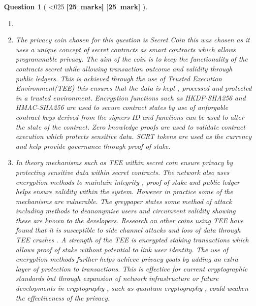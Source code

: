 \documentclass[a4paper]{article}
\theoremstyle{que}
\newtheorem{question}{Question}
\newcommand\points[1]{%
\ifnum1<0#1\relax%
    {\bf \small [#1~marks]}%
  \else%
    {\bf \small [#1~mark]}%
  \fi%
}%
\begin{document}
\begin{question}[\points{25}]
\begin{enumerate}[label=(\alph*)]
    \item
    \item[(i)] The privacy coin chosen for this question is Secret Coin \cite{secret_network_graypaper} this was chosen as it uses a unique concept of secret contracts as smart contracts which allows programmable privacy. The aim of the coin is to keep the functionality of the contracts secret while allowing transaction outcome and validity through public ledgers. This is achieved through the use of Trusted Execution Environment(TEE) this ensures that the data is kept , processed and protected in a trusted environment. Encryption functions such as HKDF-SHA256 and HMAC-SHA256 are used to secure contract states by use of unforgable contract keys derived from the signers ID and functions can be used to alter the state of the contract. Zero knowledge proofs are used to validate contract execution which protects sensitive data. SCRT tokens are used as the currency and help provide governance through proof of stake. \cite{secret_foundation_docs}
    
    \item[(ii)] In theory mechanisms such as TEE within secret coin ensure privacy by protecting sensitive data within secret contracts. The network also uses encryption methods to maintain integrity , proof of stake and public ledger helps ensure validity within the system. However in practice some of the mechanisms are vulnerable. The greypaper \cite{secret_network_graypaper} states some method of attack including methods to deanonymise users and circumvent validity showing these are known to the developers. Research on other coins using TEE have found that it is susceptible to side channel attacks and loss of data through TEE crashes \cite{lind2017teechain}. A strength of the TEE is encrypted staking transactions which allows proof of stake without potential to link user identity. The use of encryption methods further helps achieve privacy goals by adding an extra layer of protection to transactions. This is effective for current cryptographic standards but through expansion of network infrastructure or future developments in cryptography , such as quantum cryptography \cite{pirandola2020advances} , could weaken the effectiveness of the privacy.
    

\end{enumerate}
\end{question}
\end{document}
